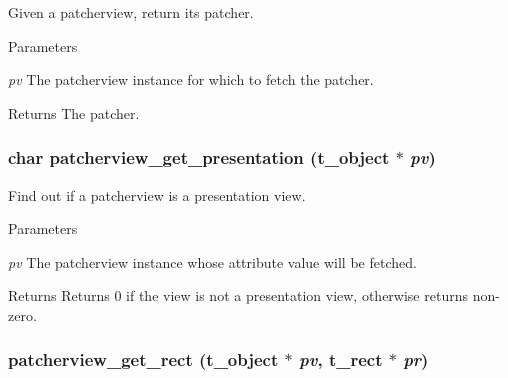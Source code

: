 Given a patcherview, return its patcher. 
\begin{DoxyParams}{Parameters}
\item[{\em pv}]The patcherview instance for which to fetch the patcher. \end{DoxyParams}
\begin{DoxyReturn}{Returns}
The patcher. 
\end{DoxyReturn}
\hypertarget{group__jpatcherview_ga196c47fa60725d496c75b400da72d8a9}{
\subsubsection[{patcherview\_\-get\_\-presentation}]{\setlength{\rightskip}{0pt plus 5cm}char patcherview\_\-get\_\-presentation ({\bf t\_\-object} $\ast$ {\em pv})}}
\label{group__jpatcherview_ga196c47fa60725d496c75b400da72d8a9}


Find out if a patcherview is a presentation view. 
\begin{DoxyParams}{Parameters}
\item[{\em pv}]The patcherview instance whose attribute value will be fetched. \end{DoxyParams}
\begin{DoxyReturn}{Returns}
Returns 0 if the view is not a presentation view, otherwise returns non-\/zero. 
\end{DoxyReturn}
\hypertarget{group__jpatcherview_ga310590cbb1dd9fbe5c8c228e35fe11ef}{
\subsubsection[{patcherview\_\-get\_\-rect}]{ patcherview\_\-get\_\-rect ({\bf t\_\-object} $\ast$ {\em pv}, \/  {\bf t\_\-rect} $\ast$ {\em pr})}}
\label{group__jpatcherview_ga310590cbb1dd9fbe5c8c228e35fe11ef}


